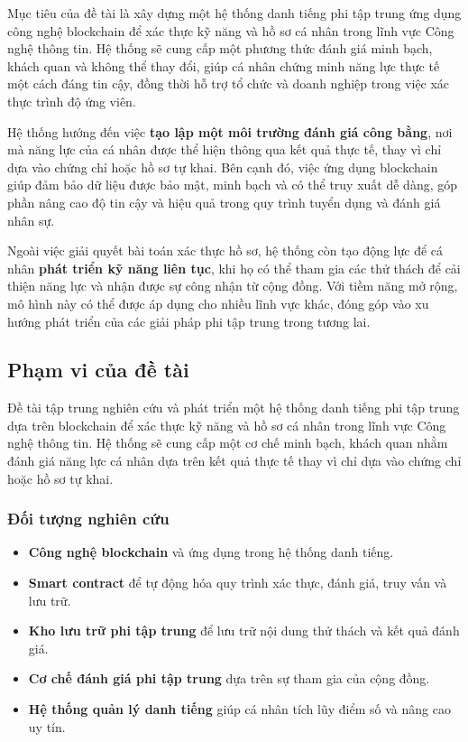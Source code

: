 \documentclass{article}[14pt]
\begin{document}
{    Mục tiêu của đề tài là xây dựng một hệ thống danh tiếng phi tập trung ứng dụng công nghệ blockchain để xác thực kỹ năng và hồ sơ cá nhân trong lĩnh vực Công nghệ thông tin. 
    Hệ thống sẽ cung cấp một phương thức đánh giá minh bạch, khách quan và không thể thay đổi, giúp cá nhân chứng minh năng lực thực tế một cách đáng tin cậy, 
    đồng thời hỗ trợ tổ chức và doanh nghiệp trong việc xác thực trình độ ứng viên.

    Hệ thống hướng đến việc \textbf{tạo lập một môi trường đánh giá công bằng}, nơi mà năng lực của cá nhân được thể hiện thông qua kết quả thực tế, 
    thay vì chỉ dựa vào chứng chỉ hoặc hồ sơ tự khai. Bên cạnh đó, việc ứng dụng blockchain giúp đảm bảo dữ liệu được bảo mật, 
    minh bạch và có thể truy xuất dễ dàng, góp phần nâng cao độ tin cậy và hiệu quả trong quy trình tuyển dụng và đánh giá nhân sự.

    Ngoài việc giải quyết bài toán xác thực hồ sơ, hệ thống còn tạo động lực để cá nhân \textbf{phát triển kỹ năng liên tục}, khi họ có thể tham gia các thử thách 
    để cải thiện năng lực và nhận được sự công nhận từ cộng đồng. Với tiềm năng mở rộng, mô hình này có thể được áp dụng cho nhiều lĩnh vực khác, 
    đóng góp vào xu hướng phát triển của các giải pháp phi tập trung trong tương lai.
    
    \subsection{Phạm vi của đề tài}
    
    Đề tài tập trung nghiên cứu và phát triển một hệ thống danh tiếng phi tập trung dựa trên blockchain để xác thực kỹ năng và hồ sơ cá nhân trong lĩnh vực Công nghệ thông tin. 
    Hệ thống sẽ cung cấp một cơ chế minh bạch, khách quan nhằm đánh giá năng lực cá nhân dựa trên kết quả thực tế thay vì chỉ dựa vào chứng chỉ hoặc hồ sơ tự khai.

    \subsubsection{Đối tượng nghiên cứu}
    \begin{itemize}
        \large
        \item \textbf{Công nghệ blockchain} và ứng dụng trong hệ thống danh tiếng.
        \item \textbf{Smart contract} để tự động hóa quy trình xác thực, đánh giá, truy vấn và lưu trữ.
        \item \textbf{Kho lưu trữ phi tập trung} để lưu trữ nội dung thử thách và kết quả đánh giá.
        \item \textbf{Cơ chế đánh giá phi tập trung} dựa trên sự tham gia của cộng đồng.
        \item \textbf{Hệ thống quản lý danh tiếng} giúp cá nhân tích lũy điểm số và nâng cao uy tín.
    \end{itemize}

}
\end{document}
